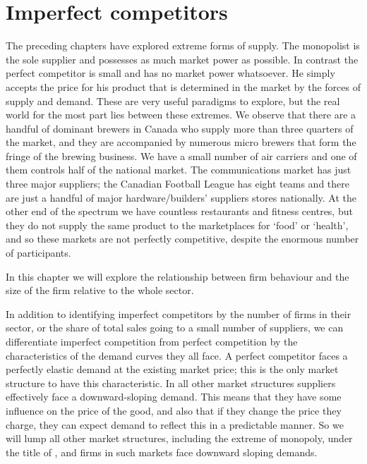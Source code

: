 \section{Imperfect competitors}\label{sec:ch11sec1}

The preceding chapters have explored extreme forms of supply. The monopolist
is the sole supplier and possesses as much market power as possible. In
contrast the perfect competitor is small and has no market power whatsoever.
He simply accepts the price for his product that is determined in the market
by the forces of supply and demand. These are very useful paradigms to
explore, but the real world for the most part lies between these extremes.
We observe that there are a handful of dominant brewers in Canada who supply
more than three quarters of the market, and they are accompanied by numerous
micro brewers that form the fringe of the brewing business. We have a small
number of air carriers and one of them controls half of the national market.
The communications market has just three major suppliers; the Canadian
Football League has eight teams and there are just a handful of major
hardware/builders' suppliers stores nationally. At the other end of the
spectrum we have countless restaurants and fitness centres, but they do not
supply the same product to the marketplaces for `food' or `health', and so
these markets are not perfectly competitive, despite the enormous number of
participants.

In this chapter we will explore the relationship between firm behaviour and
the size of the firm relative to the whole sector.

In addition to identifying imperfect competitors by the number of firms in
their sector, or the share of total sales going to a small number of
suppliers, we can differentiate imperfect competition from perfect
competition by the characteristics of the demand curves they all face. A
perfect competitor faces a perfectly elastic demand at the existing market
price; this is the only market structure to have this characteristic. In all
other market structures suppliers effectively face a downward-sloping
demand. This means that they have some influence on the price of the good,
and also that if they change the price they charge, they can expect demand
to reflect this in a predictable manner. So we will lump all other market
structures, including the extreme of monopoly, under the title of %
, and firms in such markets face downward
sloping demands.

